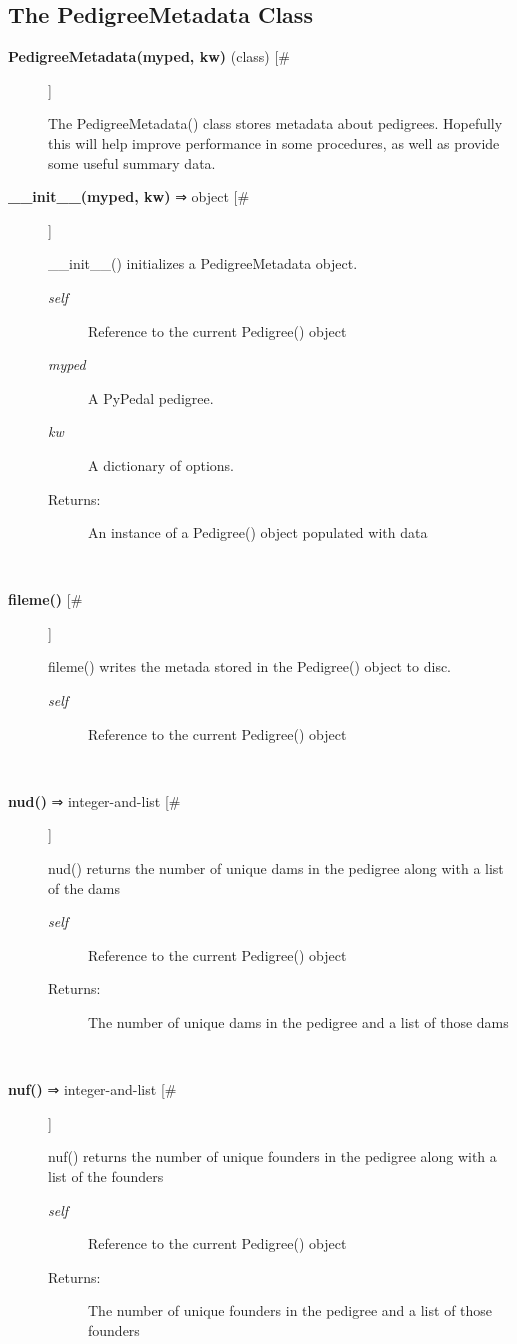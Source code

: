 \subsection*{The PedigreeMetadata Class}
\begin{description}
\item[\textbf{PedigreeMetadata(myped, kw)} (class) [\#]
]
\par The PedigreeMetadata() class stores metadata about pedigrees.  Hopefully this will help improve performance in some procedures,
as well as provide some useful summary data.

\item[\textbf{\_\_init\_\_(myped, kw)} ⇒ object [\#]
]
\par \_\_init\_\_() initializes a PedigreeMetadata object.
\begin{description}
\item[\textit{self}
]
Reference to the current Pedigree() object
\item[\textit{myped}
]
A PyPedal pedigree.
\item[\textit{kw}
]
A dictionary of options.
\item[Returns:
]
An instance of a Pedigree() object populated with data
\end{description}\\

\item[\textbf{fileme()} [\#]
]
\par fileme() writes the metada stored in the Pedigree() object to disc.
\begin{description}
\item[\textit{self}
]
Reference to the current Pedigree() object
\end{description}\\

\item[\textbf{nud()} ⇒ integer-and-list [\#]
]
\par nud() returns the number of unique dams in the pedigree along with a list of the dams
\begin{description}
\item[\textit{self}
]
Reference to the current Pedigree() object
\item[Returns:
]
The number of unique dams in the pedigree and a list of those dams
\end{description}\\

\item[\textbf{nuf()} ⇒ integer-and-list [\#]
]
\par nuf() returns the number of unique founders in the pedigree along with a list of the founders
\begin{description}
\item[\textit{self}
]
Reference to the current Pedigree() object
\item[Returns:
]
The number of unique founders in the pedigree and a list of those founders
\end{description}\\


\end{description}
